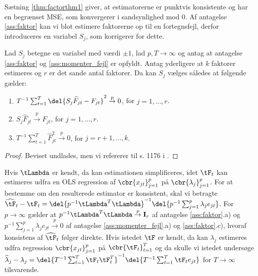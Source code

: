 Sætning \ref{thm:factorthm1} giver, at estimatorerne er punktvis konsistente og har en begrænset MSE, som konvergerer i sandsynlighed mod 0.
Af antagelse \ref{ass:faktor} kan vi blot estimere faktorerne op til en fortegnsfejl, derfor introduceres en variabel \(S_j\), som korrigerer for dette.
%
\begin{thm} \label{thm:factorthm1}
Lad \(S_j\) betegne en variabel med værdi \(\pm 1\), lad \(p, T \rightarrow \infty\) og antag at antagelse \ref{ass:faktor} og \ref{ass:momenter_fejl} er opfyldt.
Antag yderligere at \(k\) faktorer estimeres og \(r\) er det sande antal faktorer.
Da kan \(S_j\) vælges således at følgende gælder:
\begin{enumerate}
\item \(T^{-1} \sum_{t=1}^T \del{S_j \widehat{F}_{jt} - F_{jt}}^2 \overset{p}{\rightarrow} 0\), for \(j=1, \ldots, r\).
\item \(S_j \widehat{F}_{jt} \overset{p}{\rightarrow} F_{jt}\), for \(j=1, \ldots, r\).
\item \(T^{-1} \sum_{t=1}^T \widehat{F}_{jt}^2 \overset{p}{\rightarrow} 0\), for \(j=r+1, \ldots, k\).
\end{enumerate}
\end{thm}
%
\begin{proof}
Beviset undlades, men vi refererer til s. 1176 i \citep{stock_watson_2002a}.
\end{proof}
%
Hvis \(\tLambda\) er kendt, da kan estimationen simplificeres, idet \(\tF_t\)  kan estimeres udfra en OLS regression af \(\cbr{x_{jt}}_{j=1}^p\) på \(\cbr{\lambda_j}_{j=1}^p\).
For at bestemme om den resulterede estimator er konsistent, skal vi betragte \(\widehat{\tF}_t - \tF_t = \del{p^{-1} \tLambda^T \tLambda}^{-1} \del{p^{-1} \sum_{j=1}^p \lambda_j e_{jt}}\).
For \(p \rightarrow \infty\) gælder at \(p^{-1} \tLambda^T \tLambda \overset{p}{\rightarrow} \mathbf{I}_r\) af antagelse \ref{ass:faktor}.a) og \(p^{-1} \sum_{j=1}^p \lambda_j e_{jt} \overset{p}{\rightarrow} 0\) af antagelse \ref{ass:momenter_fejl}.a) og \ref{ass:faktor}.c), hvoraf konsistens af \(\widehat{\tF}_t\) følger direkte.
Hvis istedet \(\tF\) er kendt, da kan \(\lambda_j\) estimeres udfra regression \(\cbr{x_{jt}}_{j=1}^p\) på \(\cbr{\tF_{t}}_{t=1}^T\) og da skulle vi istedet undersøge \(\widehat{\lambda}_j - \lambda_j= \del{T^{-1} \sum_{t=1}^T \tF_t \tF_t^T}^{-1} \del{T^{-1} \sum_{t=1}^T \tF_t e_{jt}}\) for \(T \rightarrow \infty\) tilsvarende.

